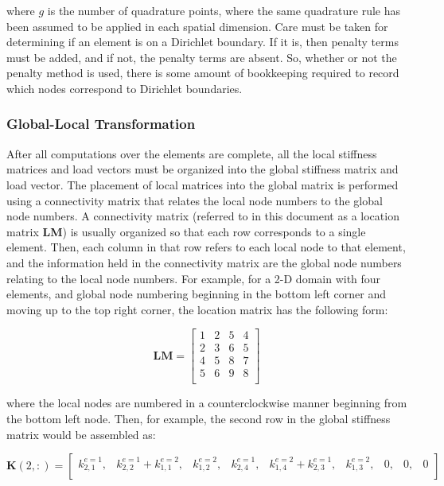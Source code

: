 \documentclass[10pt]{article}
\begin{document}
where \(g\) is the number of quadrature points, where the same quadrature rule has been assumed to be applied in each spatial dimension. Care must be taken for determining if an element is on a Dirichlet boundary. If it is, then penalty terms must be added, and if not, the penalty terms are absent. So, whether or not the penalty method is used, there is some amount of bookkeeping required to record which nodes correspond to Dirichlet boundaries.

\subsubsection{Global-Local Transformation}

After all computations over the elements are complete, all the local stiffness matrices and load vectors must be organized into the global stiffness matrix and load vector. The placement of local matrices into the global matrix is performed using a connectivity matrix that relates the local node numbers to the global node numbers. A connectivity matrix (referred to in this document as a location matrix \textbf{LM}) is usually organized so that each row corresponds to a single element. Then, each column in that row refers to each local node to that element, and the information held in the connectivity matrix are the global node numbers relating to the local node numbers. For example, for a 2-D domain with four elements, and global node numbering beginning in the bottom left corner and moving up to the top right corner, the location matrix has the following form:

\begin{equation}
\textbf{LM}=\begin{bmatrix}
1 & 2 & 5 & 4\\
2 & 3 & 6 & 5\\
4 & 5 & 8 & 7\\
5 & 6 & 9 & 8\\
\end{bmatrix}
\end{equation}

where the local nodes are numbered in a counterclockwise manner beginning from the bottom left node. Then, for example, the second row in the global stiffness matrix would be assembled as:

\begin{equation}
\textbf{K}(2,:)=\begin{bmatrix}
k_{2,1}^{e=1}, & k_{2,2}^{e=1}+k_{1,1}^{e=2}, & k_{1,2}^{e=2}, & k_{2,4}^{e=1}, & k_{1,4}^{e=2}+k_{2,3}^{e=1}, & k_{1,3}^{e=2}, & 0, & 0, & 0\\
\end{bmatrix}
\end{equation}
\end{document}
